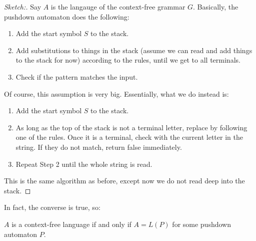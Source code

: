 \begin{proof}
	[Sketch:]
	Say $A$ is the langauge of the context-free grammar $G$.
	Basically, the pushdown automaton does the following:
	\begin{enumerate}
		\item Add the start symbol $S$ to the stack.
		\item Add substitutions to things in the stack (assume we can read and add things to the stack for now) according to the rules, until we get to all terminals.
		\item Check if the pattern matches the input.
	\end{enumerate}
	Of course, this assumption is very big. Essentially, what we do instead is:
	\begin{enumerate}
		\item Add the start symbol $S$ to the stack.
		\item As long as the top of the stack is not a terminal letter, replace by following one of the rules. Once it is a terminal, check with the current letter in the string. If they do not match, return false immediately.
		\item Repeat Step 2 until the whole string is read.
	\end{enumerate}
	This is the same algorithm as before, except now we do not read deep into the stack.
\end{proof}

In fact, the converse is true, so:

\begin{thm}
	$A$ is a context-free language if and only if $A = L(P)$ for some pushdown automaton $P$.
\end{thm}

